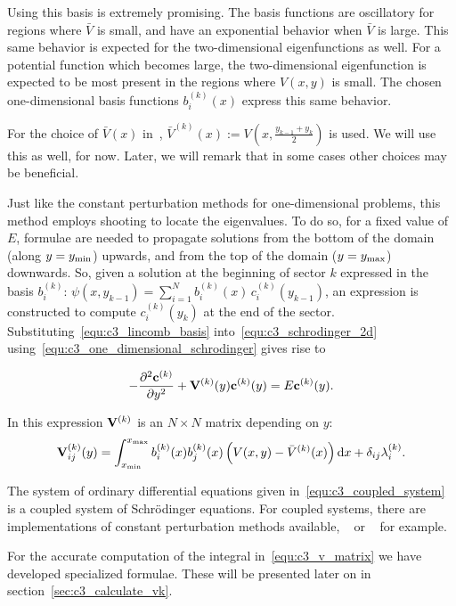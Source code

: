 Using this basis is extremely promising. The basis functions are oscillatory for regions where $\bar{V}$ is small, and have an exponential behavior when $\bar{V}$ is large. This same behavior is expected for the two-dimensional eigenfunctions as well. For a potential function which becomes large, the two-dimensional eigenfunction is expected to be most present in the regions where $V(x, y)$ is small. The chosen one-dimensional basis functions $b_i^{(k)}(x)$ express this same behavior.

For the choice of $\bar{V}(x)$ in~\cite{ixaru_new_2010}, $\bar{V}^{(k)}(x) := V\left(x, \frac{y_{k-1} + y_k}{2}\right)$ is used. We will use this as well, for now. Later, we will remark that in some cases other choices may be beneficial.

Just like the constant perturbation methods for one-dimensional problems, this method employs shooting to locate the eigenvalues. To do so, for a fixed value of $E$, formulae are needed to propagate solutions from the bottom of the domain (along $y = {y_{\text{min}}}$) upwards, and from the top of the domain ($y = {y_{\text{max}}}$) downwards. So, given a solution at the beginning of sector $k$ expressed in the basis $b_i^{(k)}$: $ \psi(x, y_{k-1}) = \sum_{i=1}^{N} b_i^{(k)}(x)\, c_i^{(k)}(y_{k-1}) $, an expression is constructed to compute $c^{(k)}_i(y_k)$ at the end of the sector. Substituting~\eqref{equ:c3_lincomb_basis} into~\eqref{equ:c3_schrodinger_2d} using~\eqref{equ:c3_one_dimensional_schrodinger} gives rise to

\begin{equation}\label{equ:c3_coupled_system}
  -\pdv[2]{\vb{c}^{(k)}}{y} + \vb{V}^{(k)}(y) \vb{c}^{(k)}(y) = E \vb{c}^{(k)}(y) \text{.}
\end{equation}

In this expression $\vb{V}^{(k)}$ is an $N\times N$ matrix depending on $y$:
\begin{equation}\label{equ:c3_v_matrix}
  \vb{V}^{(k)}_{ij}(y) = \int_{{x_{\text{min}}}}^{{x_{\text{max}}}} b_i^{(k)}(x) b_j^{(k)}(x) \left(V(x, y) - \bar{V}^{(k)}(x)\right) \dd x + \delta_{ij} \lambda_i^{(k)} \text{.}
\end{equation}

The system of ordinary differential equations given in~\eqref{equ:c3_coupled_system} is a coupled system of Schrö\-dinger equations. For coupled systems, there are implementations of constant perturbation methods available, \lilix{}~\cite{ixaru_lilix_2002} or \matscs{}~\cite{ledoux_numerical_2007} for example.

For the accurate computation of the integral in~\eqref{equ:c3_v_matrix} we have developed specialized formulae. These will be presented later on in section~\ref{sec:c3_calculate_vk}.

